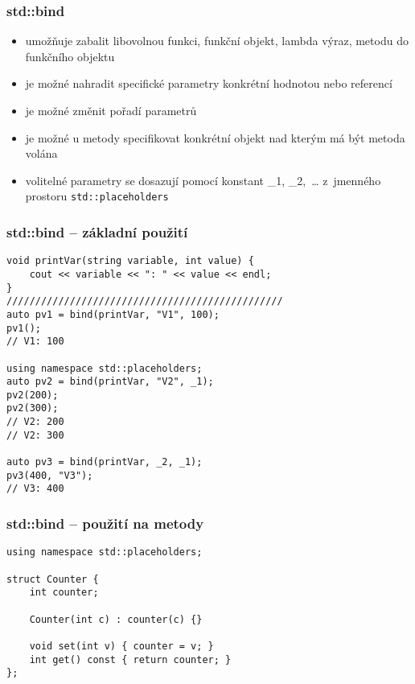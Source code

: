 
\begin{frame}[fragile]
\frametitle{std::bind}

\begin{block}{}
\begin{itemize}
\item umožňuje zabalit libovolnou funkci, funkční objekt, lambda výraz, metodu do funkčního objektu
\item je možné nahradit specifické parametry konkrétní hodnotou nebo referencí
\item je možné změnit pořadí parametrů
\item je možné u metody specifikovat konkrétní objekt nad kterým má být metoda volána
\item volitelné parametry se dosazují pomocí konstant \_1, \_2,~\ldots{} z~jmenného prostoru \lstinline|std::placeholders|
\end{itemize}
\end{block}
\end{frame}


\begin{frame}[fragile]
\frametitle{std::bind -- základní použití}

\begin{yesblock}
\begin{lstlisting}[basicstyle=\small]
void printVar(string variable, int value) {
	cout << variable << ": " << value << endl;
}
////////////////////////////////////////////////
auto pv1 = bind(printVar, "V1", 100);
pv1();
// V1: 100

using namespace std::placeholders;
auto pv2 = bind(printVar, "V2", _1);
pv2(200);
pv2(300);
// V2: 200
// V2: 300

auto pv3 = bind(printVar, _2, _1);
pv3(400, "V3");
// V3: 400
\end{lstlisting}
\end{yesblock}
\end{frame}



\begin{frame}[fragile]
\frametitle{std::bind -- použití na metody}

\begin{yesblock}
\begin{lstlisting}[basicstyle=\small]
using namespace std::placeholders;

struct Counter {
	int counter; 
	
	Counter(int c) : counter(c) {}

	void set(int v) { counter = v; }
	int get() const { return counter; }
};
\end{lstlisting}
\end{yesblock}
\end{frame}

